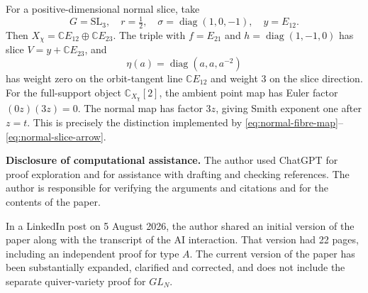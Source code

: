 \documentclass[11pt]{amsart}
\theoremstyle{definition}
\theoremstyle{remark}
\begin{document}
For a positive-dimensional normal slice, take
\[
 G=\mathrm{SL}_3,\quad r=\tfrac12,\quad
 \sigma=\operatorname{diag}(1,0,-1),\quad y=E_{12}.
\]
Then $X_\chi=\mathbb CE_{12}\oplus\mathbb CE_{23}$.
The triple with $f=E_{21}$ and $h=\operatorname{diag}(1,-1,0)$ has
slice $V=y+\mathbb CE_{23}$, and
\[
 \eta(a)=\operatorname{diag}(a,a,a^{-2})
\]
has weight zero on the orbit-tangent line $\mathbb CE_{12}$ and
weight $3$ on the slice direction.  For the full-support object
$\mathbb C_{X_\chi}[2]$, the ambient point map has Euler factor
$(0z)(3z)=0$.  The normal map has factor $3z$, giving Smith exponent
one after $z=t$.  This is precisely the distinction implemented by
\eqref{eq:normal-fibre-map}--\eqref{eq:normal-slice-arrow}.

\medskip
\noindent\textbf{Disclosure of computational assistance.}
The author used ChatGPT for proof exploration and for assistance with
drafting and checking references.  The author is responsible for verifying the
arguments and citations and for the contents of the paper.

In a LinkedIn post on 5 August 2026, the author shared an initial version of the paper along with the transcript of the AI interaction. That version had 22 pages, including an independent proof for type $A$. The current version of the paper has been substantially expanded, clarified and corrected, and does not include the separate quiver-variety proof for $GL_N$.



\end{document}
